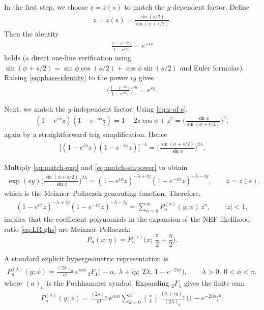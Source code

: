 \documentclass[a4paper,11pt]{article}
\numberwithin{equation}{section}
\theoremstyle{plain}
\theoremstyle{definition}
\theoremstyle{remark}
\newcommand{\1}{\ensuremath{\mathds{1}}\xspace}
\begin{document}
\medskip
\noindent
In the first step, we choose \(z=z(s)\) to match the \(y\)-dependent factor. Define
\begin{align}
z=z(s)=\frac{\sin(s/2)}{\sin(\phi+s/2)}.
\label{eq:z-of-s}
\end{align}
Then the identity
\begin{align}
\frac{1-e^{-i\phi}z}{1-e^{i\phi}z}=e^{-is}
\label{eq:phase-identity}
\end{align}
holds (a direct one-line verification using $\sin(\phi+s/2)=\sin\phi\cos(s/2)+\cos\phi\sin(s/2)$ and Euler formulas).
Raising \eqref{eq:phase-identity} to the power $iy$ gives
\begin{align}
\Big(\frac{1-e^{-i\phi}z}{1-e^{i\phi}z}\Big)^{iy}=e^{sy}.
\label{eq:match-exp}
\end{align}

\medskip
\noindent
Next, we match the \(y\)-independent factor.
Using \eqref{eq:z-of-s},
\begin{align}
(1-e^{i\phi}z)(1-e^{-i\phi}z)=1-2z\cos\phi+z^2
=\Big(\frac{\sin\phi}{\sin(\phi+s/2)}\Big)^{\!2},
\label{eq:product-identity}
\end{align}
again by a straightforward trig simplification. Hence
\begin{align}
\big[(1-e^{i\phi}z)(1-e^{-i\phi}z)\big]^{-\lambda}
=\Big(\frac{\sin(\phi+s/2)}{\sin\phi}\Big)^{\!2\lambda}.
\label{eq:match-sinpower}
\end{align}

\medskip
\noindent
Multiply \eqref{eq:match-exp} and \eqref{eq:match-sinpower} to obtain
\begin{align}
\exp(sy)\Big(\frac{\sin(\phi+s/2)}{\sin\phi}\Big)^{\!2\lambda}
=
(1-e^{i\phi}z)^{-\lambda+iy}(1-e^{-i\phi}z)^{-\lambda-iy},
\qquad z=z(s),
\label{eq:full-match}
\end{align}
which is the Meixner--Pollaczek generating function. Therefore,
\begin{align}
(1-e^{i\phi}z)^{-\lambda+iy}(1-e^{-i\phi}z)^{-\lambda-iy}
=\sum_{n=0}^\infty P_n^{(\lambda)}(y;\phi)\,z^n,
\qquad |z|<1,
\label{eq:MP-generating}
\end{align}
implies that the coefficient polynomials in the expansion of the NEF likelihood ratio \eqref{eq:LR-ghs}
are Meixner--Pollaczek:
\[
P_n(x;\eta)=P_n^{(r)}\!\Big(x;\,\frac{\pi}{2}+\frac{\eta}{2}\Big).
\]

A standard explicit hypergeometric representation is
\begin{align}
P_n^{(\lambda)}(y;\phi)
=\frac{(2\lambda)_n}{n!}\,e^{in\phi}\,
{}_2F_1\!\Big(-n,\ \lambda+iy;\ 2\lambda;\ 1-e^{-2i\phi}\Big),
\qquad \lambda>0,\ 0<\phi<\pi,
\label{eq:MP-hypergeom}
\end{align}
where $(a)_n$ is the Pochhammer symbol. Expanding ${}_2F_1$ gives the finite sum
\begin{align}
P_n^{(\lambda)}(y;\phi)
=\frac{(2\lambda)_n}{n!}\,e^{in\phi}
\sum_{k=0}^n \binom{n}{k}\,
\frac{(\lambda+iy)_k}{(2\lambda)_k}\,
\big(1-e^{-2i\phi}\big)^k.
\label{eq:MP-finite-sum}
\end{align}
\end{document}
